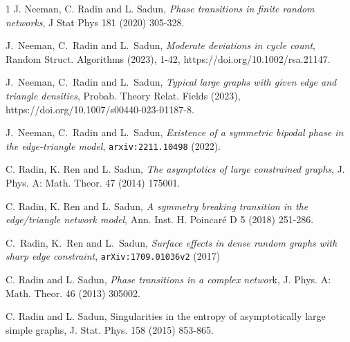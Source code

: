 \documentclass[12pt]{amsart}
\newcommand{\1}{\mathbf{1}}
\begin{document}
\begin{thebibliography}{1}
 {\sc  J. Neeman, C. Radin and L. Sadun}, {\em Phase transitions in finite random
  networks}, J Stat Phys 181 (2020) 305-328.  

{\sc J.\ Neeman, C.\ Radin and L.\ Sadun}, {\em Moderate deviations in cycle count},
Random Struct. Algorithms (2023), 1-42, https://doi.org/10.1002/rsa.21147.

  {\sc J.\ Neeman, C.\ Radin and L.\ Sadun}, {\em Typical large graphs with
  given edge and triangle densities},
Probab. Theory Relat. Fields (2023),
https://doi.org/10.1007/s00440-023-01187-8.

  {\sc J.\ Neeman, C.\ Radin and L.\ Sadun}, {\em Existence of a
    symmetric
    bipodal phase in the edge-triangle model},
\texttt{arxiv:2211.10498} (2022).


{\sc C. Radin, K. Ren and L. Sadun}, {\em The asymptotics of large constrained
graphs}, J. Phys. A: Math. Theor. 47 (2014) 175001.

 {\sc C. Radin, K. Ren and L. Sadun}, {\em A symmetry breaking
transition in the edge/triangle
network model}, {Ann. Inst. H. Poincar\'e D} 5 (2018) 251-286.
 
 {\sc C.\ Radin, K.\ Ren and L.\ Sadun}, {\em Surface effects in
    dense random graphs with sharp edge constraint}, \texttt{arXiv:1709.01036v2} (2017)

{\sc C. Radin and L. Sadun}, 
{\em Phase transitions in a complex networ}k, J. Phys. A: Math. Theor. 46
(2013) 305002.

{\sc C. Radin and L. Sadun}, 
Singularities in the entropy of asymptotically large simple graphs, 
{J. Stat. Phys. 158 (2015) 853-865.}

\end{thebibliography}
\end{document}
